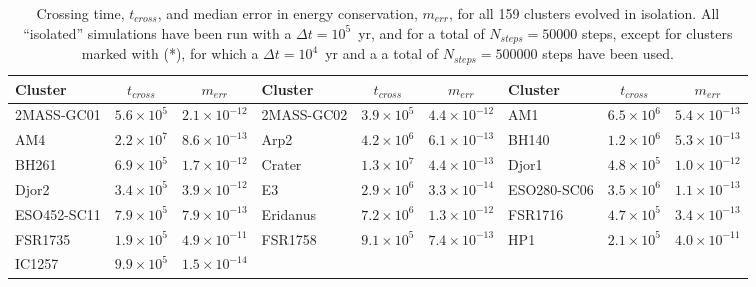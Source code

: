         \begin{table}
        \caption[Crossing and time, time step, and energy conservation for each Globular cluster]{Crossing time, $t_{cross}$, and median error in energy conservation, $m_{err}$, for all 159 clusters evolved in isolation. All ``isolated'' simulations have been run with a $\Delta t=10^5$~yr, and for a total of $N_{steps}=50 000$ steps, except for clusters marked with (*), for which a $\Delta t=10^4$~yr and a a total of $N_{steps}=500 000$ steps have been used. }\label{tcross-energy}
        \tiny
        \begin{center}
        \begin{tabular}{l | c | c | l |  c|   c | l | c | c } 
        \hline
                Cluster &       $ t_{cross}$ &  $m_{err}$ & Cluster &       $ t_{cross}$ &  $m_{err}$  & Cluster &       $ t_{cross}$ &  $m_{err}$ \\
                \hline \hline
            2MASS-GC01 & $5.6\times10^5$ &         $ 2.1\times10^{-12}$  &
            2MASS-GC02 &  $3.9\times10^5$ &          $4.4\times10^{-12}$ &
                AM1 &  $6.5\times10^6$ &          $5.4\times10^{-13}$ \\
                AM4 &  $2.2\times10^7$ &          $8.6\times10^{-13}$ & 
                Arp2 &  $4.2\times10^6$ &          $6.1\times10^{-13}$ &  
                BH140 &  $1.2\times10^6$ &         $ 5.3\times10^{-13}$  \\
                BH261 &  $6.9\times10^5$ &          $1.7\times10^{-12}$  &
                Crater &  $1.3\times10^7$ &         $ 4.4\times10^{-13}$ &
                Djor1 &  $4.8\times10^5$ &          $1.0\times10^{-12}$  \\
                Djor2 &  $3.4\times10^5$ &          $3.9\times10^{-12}$ &
                    E3 &  $2.9\times10^6$ &          $3.3\times10^{-14}$  &
        ESO280-SC06 &  $3.5\times10^6$ &         $ 1.1\times10^{-13}$  \\
        ESO452-SC11 &  $7.9\times10^5$ &          $7.9\times10^{-13}$  &
            Eridanus &  $7.2\times10^6$ &          $1.3\times10^{-12}$ &
            FSR1716 &  $4.7\times10^5$ &         $ 3.4\times10^{-13}$  \\
            FSR1735 &  $1.9\times10^5$ &          $4.9\times10^{-11}$ &
            FSR1758 &  $9.1\times10^5$ &          $7.4\times10^{-13}$  &
                HP1 &  $2.1\times10^5$ &          $4.0\times10^{-11}$  \\
                IC1257 &  $9.9\times10^5$ &         $ 1.5\times10^{-14}$ &

\end{tabular}
\end{center}
\end{table}
